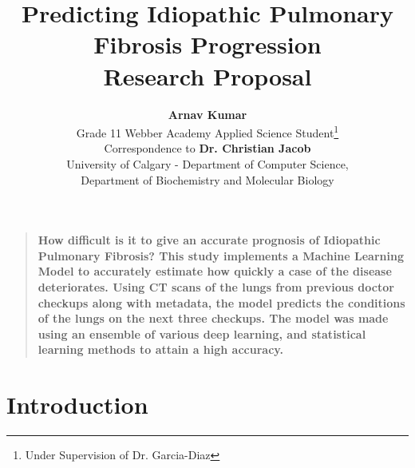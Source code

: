\documentclass[12pt]{article}
\title{Predicting Idiopathic Pulmonary Fibrosis Progression \\[0.1in] Research Proposal}
\author{\textbf{Arnav Kumar} \\ 
Grade 11 Webber Academy Applied Science Student\thanks{Under Supervision of Dr. Garcia-Diaz} \\[0.1in] 
Correspondence to \textbf{Dr. Christian Jacob} \\ 
University of Calgary - Department of Computer Science, \\ 
Department of Biochemistry and Molecular Biology}
\date{}
\newenvironment{sciabstract}{%
\begin{quote} \bf}
{\end{quote}}
\begin{document}
 


\baselineskip24pt


\maketitle 




\begin{sciabstract}
  How difficult is it to give an accurate prognosis of Idiopathic Pulmonary Fibrosis?
  This study implements a Machine Learning Model to accurately estimate how quickly a case of the disease deteriorates.
  Using CT scans of the lungs from previous doctor checkups along with metadata, the model predicts the conditions of the lungs on the next three checkups.
  The model was made using an ensemble of various deep learning, and statistical learning methods to attain a high accuracy.
\end{sciabstract}




\section*{Introduction}
\end{document}
